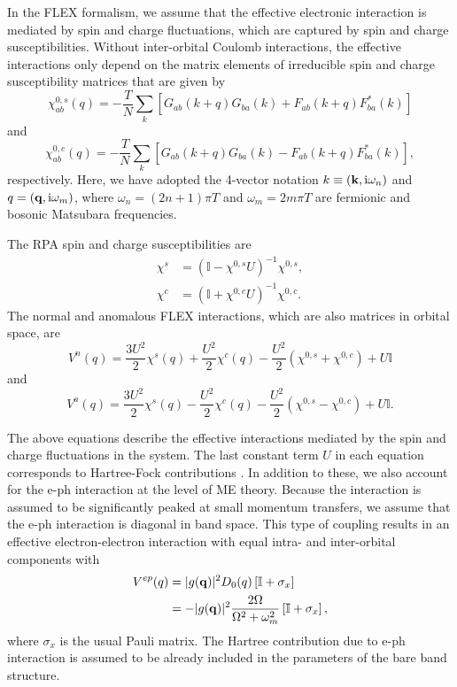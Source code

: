 \documentclass[%
 reprint,
 superscriptaddress,
nofootinbib,
nobibnotes,
 amsmath,amssymb,
 aps,
 prb,
 dvipsnames, 
 floatfix
]{revtex4-2}
\newcommand{\eph}{e-ph}
\begin{document}
In the FLEX formalism, we assume that the effective electronic interaction is mediated by spin and charge fluctuations, which are captured by spin and charge susceptibilities. Without inter-orbital Coulomb interactions, the effective interactions \cite{Schmalian1998,Kontani1998} only depend on the matrix elements of irreducible spin and charge susceptibility matrices that are given by 
\begin{equation}\label{eq:Chis0}
    \chi^{0,s}_{ab} (q) = - \frac{T}{N} \sum_k \left[ G_{ab} (k+q) G_{ba} (k)
        + F_{ab} (k+q) F^*_{ba}(k) \right] 
\end{equation}
and 
\begin{equation}\label{eq:Chic0}
    \chi^{0,c}_{ab} (q) = - \frac{T}{N} \sum_k \left[ G_{ab} (k+q) G_{ba} (k)
        - F_{ab} (k+q) F^*_{ba}(k) \right], 
\end{equation}
respectively. Here, we have adopted the 4-vector notation $k \equiv ({\bf k}, \text{i} \omega_n)$ and $q = ({\bf q}, \text{i} \omega_m)$, where $\omega_n = (2n+1) \pi T$ and $\omega_m = 2m \pi T$ are fermionic and bosonic Matsubara frequencies. 

The RPA spin and charge susceptibilities are
\begin{align}
    \chi^s &= ( \mathbb{I} - \chi^{0,s} U )^{-1} \chi^{0,s}, \\
    \chi^c &= ( \mathbb{I} + \chi^{0,c} U )^{-1} \chi^{0,c}.
\end{align}
The normal and anomalous FLEX interactions, which are also matrices in orbital space, are
\begin{equation}\label{Eq:FLEX_Int1}
    V^n (q) = \frac{3U^2}{2} \chi^s (q) + \frac{U^2}{2} \chi^c (q) - \frac{U^2}{2} (\chi^{0,s} + \chi^{0,c}) + U\mathbb{I}
\end{equation}
and
\begin{equation}\label{Eq:FLEX_Int2}
    V^a (q) = \frac{3U^2}{2} \chi^s (q) - \frac{U^2}{2} \chi^c (q) - \frac{U^2}{2} (\chi^{0,s} - \chi^{0,c}) + U\mathbb{I} .
\end{equation}

The above equations describe the effective interactions mediated by the spin and charge fluctuations in the system. The last constant term $U$ in each equation corresponds to Hartree-Fock contributions \cite{Bickers1989}. In addition to these, we also account for the {\eph} interaction at the level of ME theory. Because the interaction is assumed to be significantly peaked at small momentum transfers, we assume that the {\eph} interaction is diagonal in band space. This type of coupling results in an effective electron-electron interaction with equal intra- and inter-orbital components with
\begin{align}\nonumber
    V^{ep} (q)&= |g({\bf q})|^2 D_0(q) \left[\mathbb{I}+\sigma_x\right] \\
    &= -|g({\bf q})|^2 \frac{2 \Omega}{\Omega^2 + \omega_m^2} \left[\mathbb{I}+\sigma_x\right],\label{Eq:eph_Int}
\end{align}
where  $\sigma_x$ is the usual Pauli matrix. The Hartree contribution due to {\eph} interaction is assumed to be already included in the parameters of the bare band structure.
\end{document}
